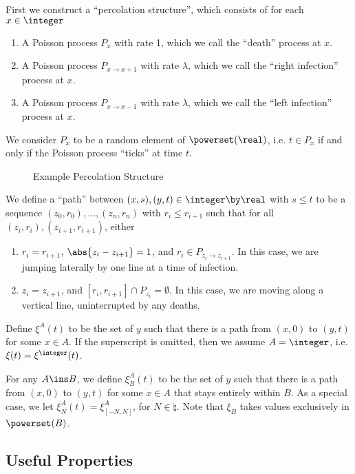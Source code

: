 \documentclass{scrartcl}
\begin{document}
First we construct a ``percolation structure'', which consists of for each $x \in \integer$
\begin{enumerate}
  \item A Poisson process $P_{x}$ with rate 1, which we call the ``death'' process at $x$.
  \item A Poisson process $P_{x \to x+1}$ with rate $\lambda$, which we call the ``right infection'' process at $x$.
  \item A Poisson process $P_{x \to x-1}$ with rate $\lambda$, which we call the ``left infection'' process at $x$.
\end{enumerate}

We consider $P_{x}$ to be a random element of $\powerset(\real)$, i.e. $t \in P_{x}$ if and only if the Poisson process ``ticks'' at time $t$.

\begin{figure}[h!]
  \centering
  \caption{Example Percolation Structure}
  \label{fig:ex_perc_structure}
\end{figure}

We define a ``path'' between $(x,s), (y,t) \in \integer \by \real$ with $s \leq t$ to be a sequence
$(z_{0},r_{0}), \ldots, (z_{n},r_{n})$ with $r_{i} \leq r_{i+1}$ such that for all $(z_{i},r_{i}),(z_{i+1},r_{i+1})$, either
\begin{enumerate}
  \item $r_{i} = r_{i+1}$, $\abs{z_{i} - z_{i+1}} = 1$, and $r_{i} \in P_{z_{i} \to z_{i+1}}$. In this case, we are jumping laterally by one line at a time of infection.
  \item $z_{i} = z_{i+1}$, and $[r_{i},r_{i+1}] \cap P_{z_{i}} = \emptyset$. In this case, we are moving along a vertical line, uninterrupted by any deaths.
\end{enumerate}

Define $\xi^{A}(t)$ to be the set of $y$ such that there is a path from $(x,0)$ to $(y,t)$ for some $x \in A$. If the superscript is omitted, then we assume $A = \integer$, i.e. $\xi(t) = \xi^{\integer}(t)$.

For any $A \ins B$, we define $\xi_{B}^{A}(t)$ to be the set of $y$ such that there is a path from $(x,0)$ to $(y,t)$ for some $x \in A$ that stays entirely within $B$. As a special case, we let $\xi_{N}^{A}(t) = \xi_{[-N,N]}^{A}$, for $N \in \natural$. Note that $\xi_{B}$ takes values exclusively in $\powerset(B)$.

\subsection{Useful Properties}
\end{document}

